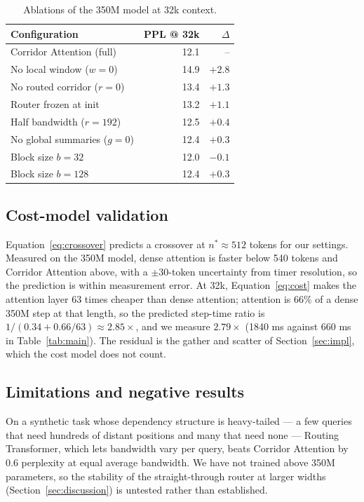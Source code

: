 \begin{table}[t]
  \centering
  \begin{tabular}{lrr}
    \toprule
    Configuration & PPL @ 32k & $\Delta$ \\
    \midrule
    Corridor Attention (full)     & 12.1 & --     \\
    No local window ($w = 0$)     & 14.9 & $+2.8$ \\
    No routed corridor ($r = 0$)  & 13.4 & $+1.3$ \\
    Router frozen at init         & 13.2 & $+1.1$ \\
    Half bandwidth ($r = 192$)    & 12.5 & $+0.4$ \\
    No global summaries ($g = 0$) & 12.4 & $+0.3$ \\
    Block size $b = 32$           & 12.0 & $-0.1$ \\
    Block size $b = 128$          & 12.4 & $+0.3$ \\
    \bottomrule
  \end{tabular}
  \caption{Ablations of the 350M model at 32k context.}
  \label{tab:ablation}
\end{table}

\subsection{Cost-model validation}\label{sec:validation}

Equation~\eqref{eq:crossover} predicts a crossover at $n^{*} \approx 512$
tokens for our settings. Measured on the 350M model, dense attention is
faster below 540 tokens and Corridor Attention above, with a $\pm 30$-token
uncertainty from timer resolution, so the prediction is within measurement
error. At 32k, Equation~\eqref{eq:cost} makes the attention layer 63 times
cheaper than dense attention; attention is 66\% of a dense 350M step at that
length, so the predicted step-time ratio is $1/(0.34 + 0.66/63) \approx
2.85\times$, and we measure $2.79\times$ (1840 ms against 660 ms in
Table~\ref{tab:main}). The residual is the gather and scatter of
Section~\ref{sec:impl}, which the cost model does not count.

\subsection{Limitations and negative results}\label{sec:limits}

On a synthetic task whose dependency structure is heavy-tailed --- a few
queries that need hundreds of distant positions and many that need none ---
Routing Transformer, which lets bandwidth vary per query, beats Corridor
Attention by 0.6 perplexity at equal average bandwidth. We have not trained
above 350M parameters, so the stability of the straight-through router at
larger widths (Section~\ref{sec:discussion}) is untested rather than
established.

